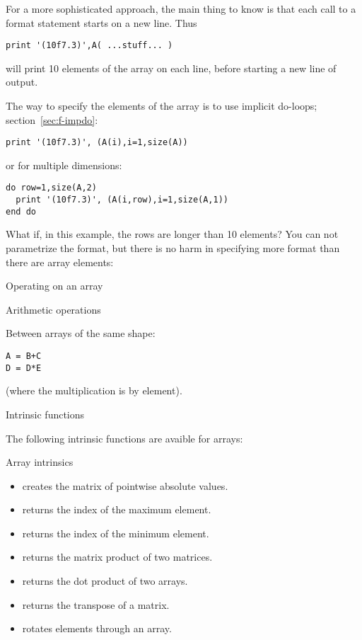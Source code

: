 For a more sophisticated approach,
the main thing to know is that each call to a format statement
starts on a new line.
Thus
\begin{lstlisting}
print '(10f7.3)',A( ...stuff... )
\end{lstlisting}
will print 10 elements of the array on each line,
before starting a new line of output.

The way to specify the elements of the array
is to use implicit do-loops; section~\ref{sec:f-impdo}:
\begin{lstlisting}
print '(10f7.3)', (A(i),i=1,size(A))
\end{lstlisting}
or for multiple dimensions:
\begin{lstlisting}
do row=1,size(A,2)
  print '(10f7.3)', (A(i,row),i=1,size(A,1))
end do
\end{lstlisting}
What if, in this example, the rows are longer than 10 elements?
You can not parametrize the format,
but there is no harm in specifying more format
than there are array elements:

 {Operating on an array}

 {Arithmetic operations}

Between arrays of the same shape:
\begin{lstlisting}
A = B+C
D = D*E
\end{lstlisting}
(where the multiplication is by element).

 {Intrinsic functions}

The following intrinsic functions are avaible for arrays:
\begin{block}{Array intrinsics}
  \label{sl:array-funcf}
  \begin{itemize}
  \item {} creates the matrix of pointwise absolute values.
  \item {} returns the index of the maximum
    element.
  \item {} returns the index of the minimum element.
  \item {} returns the matrix product of two matrices.
  \item {} returns the dot product of two
    arrays.
  \item {} returns the transpose of a matrix.
  \item {} rotates elements through an array.
  \end{itemize}
\end{block}

